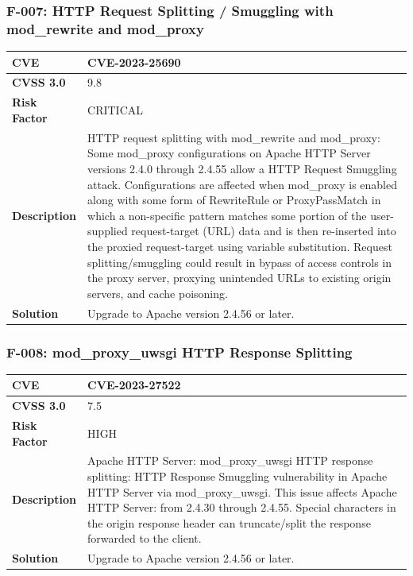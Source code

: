 \subsubsection{F-007: HTTP Request Splitting / Smuggling with mod\_rewrite and mod\_proxy}
\begin{tabular}{|p{2.8cm}|p{12.2cm}|}
\hline
\textbf{CVE} & CVE-2023-25690 \\ \hline
\textbf{CVSS 3.0} & 9.8 \\ \hline
\textbf{Risk Factor} & CRITICAL \\ \hline
\textbf{Description} & HTTP request splitting with mod\_rewrite and mod\_proxy: Some mod\_proxy configurations on Apache HTTP Server versions 2.4.0 through 2.4.55 allow a HTTP Request Smuggling attack. Configurations are affected when mod\_proxy is enabled along with some form of RewriteRule or ProxyPassMatch in which a non-specific pattern matches some portion of the user-supplied request-target (URL) data and is then re-inserted into the proxied request-target using variable substitution. Request splitting/smuggling could result in bypass of access controls in the proxy server, proxying unintended URLs to existing origin servers, and cache poisoning. \\ \hline
\textbf{Solution} & Upgrade to Apache version 2.4.56 or later. \\ \hline
\end{tabular}

\subsubsection{F-008: mod\_proxy\_uwsgi HTTP Response Splitting}
\begin{tabular}{|p{2.8cm}|p{12.2cm}|}
\hline
\textbf{CVE} & CVE-2023-27522 \\ \hline
\textbf{CVSS 3.0} & 7.5 \\ \hline
\textbf{Risk Factor} & HIGH \\ \hline
\textbf{Description} & Apache HTTP Server: mod\_proxy\_uwsgi HTTP response splitting: HTTP Response Smuggling vulnerability in Apache HTTP Server via mod\_proxy\_uwsgi. This issue affects Apache HTTP Server: from 2.4.30 through 2.4.55. Special characters in the origin response header can truncate/split the response forwarded to the client. \\ \hline
\textbf{Solution} & Upgrade to Apache version 2.4.56 or later. \\ \hline
\end{tabular}

